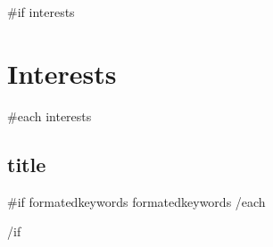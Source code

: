 \documentclass{article}
\begin{document}
{{#if interests}}\section*{Interests}{
  {{#each interests}}
    \subsection*{ {{ title }} } {
      {{#if formatedkeywords}}{{ formatedkeywords }}\ignorespaces
    }
  {{/each}}
}{{/if}}\ignorespaces
\end{document}
